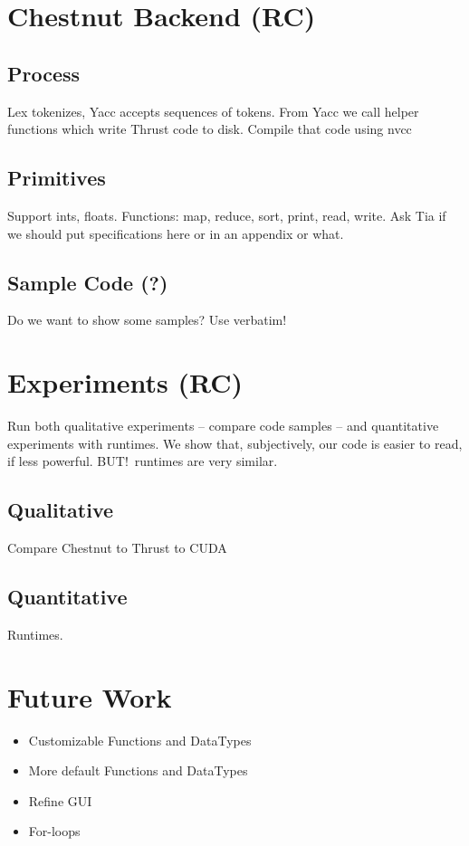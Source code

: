 \documentclass{article}
\begin{document}
\section{Chestnut Backend (RC)}

\subsection{Process}

Lex tokenizes, Yacc accepts sequences of tokens. From Yacc we call helper functions which write Thrust code to disk. Compile that code using nvcc

\subsection{Primitives}

Support ints, floats. Functions: map, reduce, sort, print, read, write. Ask Tia if we should put specifications here or in an appendix or what.

\subsection{Sample Code (?)}

Do we want to show some samples? Use verbatim!

\section{Experiments (RC)}

Run both qualitative experiments -- compare code samples -- and quantitative experiments with runtimes. We show that, subjectively, our code is easier to read, if less powerful. BUT!\ runtimes are very similar.

\subsection{Qualitative}

Compare Chestnut to Thrust to CUDA

\subsection{Quantitative}

Runtimes.

\section{Future Work}

\begin{itemize}
  \item Customizable Functions and DataTypes
  \item More default Functions and DataTypes
  \item Refine GUI
  \item For-loops
\end{itemize}
\end{document}
